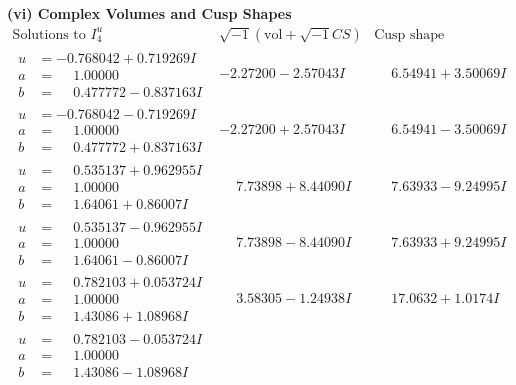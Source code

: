 \documentclass[1p]{elsarticle_modified}
\theoremstyle{definition}
\newcommand{\I}{\sqrt{-1}}
\begin{document}
\newpage\flushleft \textbf{(vi) Complex Volumes and Cusp Shapes}
$$\begin{array}{c|c|c}  
\text{Solutions to }I^u_{4}& \I (\text{vol} + \sqrt{-1}CS) & \text{Cusp shape}\\
 \hline 
\begin{aligned}
u &= -0.768042 + 0.719269 I \\
a &= \phantom{-}1.00000\phantom{ +0.000000I} \\
b &= \phantom{-}0.477772 - 0.837163 I\end{aligned}
 & -2.27200 - 2.57043 I & \phantom{-}6.54941 + 3.50069 I \\ \hline\begin{aligned}
u &= -0.768042 - 0.719269 I \\
a &= \phantom{-}1.00000\phantom{ +0.000000I} \\
b &= \phantom{-}0.477772 + 0.837163 I\end{aligned}
 & -2.27200 + 2.57043 I & \phantom{-}6.54941 - 3.50069 I \\ \hline\begin{aligned}
u &= \phantom{-}0.535137 + 0.962955 I \\
a &= \phantom{-}1.00000\phantom{ +0.000000I} \\
b &= \phantom{-}1.64061 + 0.86007 I\end{aligned}
 & \phantom{-}7.73898 + 8.44090 I & \phantom{-}7.63933 - 9.24995 I \\ \hline\begin{aligned}
u &= \phantom{-}0.535137 - 0.962955 I \\
a &= \phantom{-}1.00000\phantom{ +0.000000I} \\
b &= \phantom{-}1.64061 - 0.86007 I\end{aligned}
 & \phantom{-}7.73898 - 8.44090 I & \phantom{-}7.63933 + 9.24995 I \\ \hline\begin{aligned}
u &= \phantom{-}0.782103 + 0.053724 I \\
a &= \phantom{-}1.00000\phantom{ +0.000000I} \\
b &= \phantom{-}1.43086 + 1.08968 I\end{aligned}
 & \phantom{-}3.58305 - 1.24938 I & \phantom{-}17.0632 + 1.0174 I \\ \hline\begin{aligned}
u &= \phantom{-}0.782103 - 0.053724 I \\
a &= \phantom{-}1.00000\phantom{ +0.000000I} \\
b &= \phantom{-}1.43086 - 1.08968 I\end{aligned}

\end{array}$$
\end{document}

